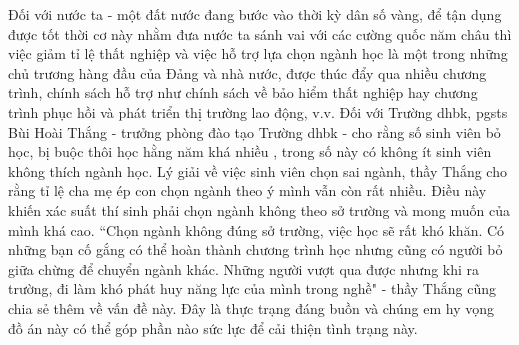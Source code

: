 Đối với nước ta - một đất nước đang bước vào thời kỳ dân số vàng, để tận dụng được tốt thời cơ này nhằm đưa nước ta sánh vai với các cường quốc năm châu thì việc giảm tỉ lệ thất nghiệp và việc hỗ trợ lựa chọn ngành học là một trong những chủ trương hàng đầu của Đảng và nhà nước, được thúc đẩy qua nhiều chương trình, chính sách hỗ trợ như chính sách về bảo hiểm thất nghiệp hay chương trình phục hồi và phát triển thị trường lao động, v.v. Đối với Trường \acrshort{dhbk}, \acrshort{pgsts} Bùi Hoài Thắng - trưởng phòng đào tạo Trường \acrshort{dhbk} - cho rằng số sinh viên bỏ học, bị buộc thôi học hằng năm khá nhiều \cite{tuoitre1}, trong số này có không ít sinh viên không thích ngành học. Lý giải về việc sinh viên chọn sai ngành, thầy Thắng cho rằng tỉ lệ cha mẹ ép con chọn ngành theo ý mình vẫn còn rất nhiều. Điều này khiến xác suất thí sinh phải chọn ngành không theo sở trường và mong muốn của mình khá cao. ``Chọn ngành không đúng sở trường, việc học sẽ rất khó khăn. Có những bạn cố gắng có thể hoàn thành chương trình học nhưng cũng có người bỏ giữa chừng để chuyển ngành khác. Những người vượt qua được nhưng khi ra trường, đi làm khó phát huy năng lực của mình trong nghề" - thầy Thắng cũng chia sẻ thêm về vấn đề này. Đây là thực trạng đáng buồn và chúng em hy vọng đồ án này có thể góp phần nào sức lực để cải thiện tình trạng này. 
